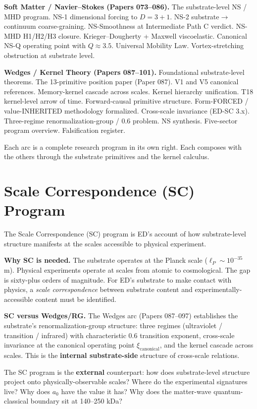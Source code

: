 \documentclass[11pt,a4paper]{article}
\begin{document}
\textbf{Soft Matter / Navier--Stokes (Papers 073--086).} The substrate-level NS / MHD program. NS-1 dimensional forcing to $D = 3+1$. NS-2 substrate$\to$continuum coarse-graining. NS-Smoothness at Intermediate Path C verdict. NS-MHD H1/H2/H3 closure. Krieger--Dougherty + Maxwell viscoelastic. Canonical NS-Q operating point with $Q \approx 3.5$. Universal Mobility Law. Vortex-stretching obstruction at substrate level.

\textbf{Wedges / Kernel Theory (Papers 087--101).} Foundational substrate-level theorems. The 13-primitive position paper (Paper 087). V1 and V5 canonical references. Memory-kernel cascade across scales. Kernel hierarchy unification. T18 kernel-level arrow of time. Forward-causal primitive structure. Form-FORCED / value-INHERITED methodology formalized. Cross-scale invariance (ED-SC 3.x). Three-regime renormalization-group / 0.6 problem. NS synthesis. Five-sector program overview. Falsification register.

Each arc is a complete research program in its own right. Each composes with the others through the substrate primitives and the kernel calculus.

\section{Scale Correspondence (SC) Program}

The Scale Correspondence (SC) program is ED's account of how substrate-level structure manifests at the scales accessible to physical experiment.

\textbf{Why SC is needed.} The substrate operates at the Planck scale ($\ell_P \sim 10^{-35}$ m). Physical experiments operate at scales from atomic to cosmological. The gap is sixty-plus orders of magnitude. For ED's substrate to make contact with physics, a \emph{scale correspondence} between substrate content and experimentally-accessible content must be identified.

\textbf{SC versus Wedges/RG.} The Wedges arc (Papers 087--097) establishes the substrate's renormalization-group structure: three regimes (ultraviolet / transition / infrared) with characteristic 0.6 transition exponent, cross-scale invariance at the canonical operating point $\xi_\mathrm{canonical}$, and the kernel cascade across scales. This is the \textbf{internal substrate-side} structure of cross-scale relations.

The SC program is the \textbf{external} counterpart: how does substrate-level structure project onto physically-observable scales? Where do the experimental signatures live? Why does $a_0$ have the value it has? Why does the matter-wave quantum-classical boundary sit at 140--250 kDa?
\end{document}
